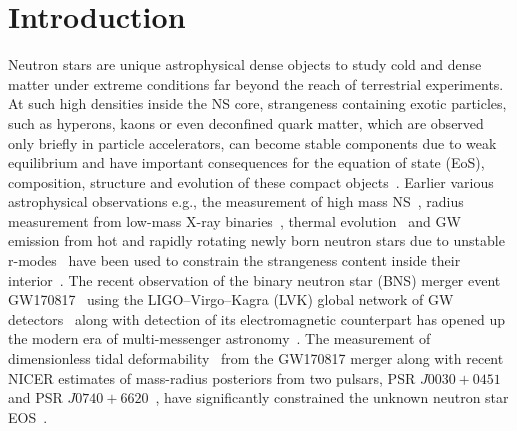 \documentclass[%
 reprint,
 amsmath,amssymb,
 aps,
]{revtex4-2}
\begin{document}
\maketitle


\section{\label{sec:intro} Introduction}
Neutron stars are unique astrophysical dense objects to study  cold  and  dense  matter  under  extreme  conditions far beyond the reach of terrestrial experiments. At such high densities inside the NS core, strangeness containing exotic  particles, such  as hyperons, kaons or even deconfined quark matter, which  are  observed  only  briefly  in  particle  accelerators, can become stable components  due to weak equilibrium and have important consequences for the equation of state (EoS), composition, structure and evolution of these compact objects~\cite{GlendenningBook,Lattimer2004,Blaschke2018}. %
Earlier various astrophysical observations e.g., the measurement of high mass NS~\cite{Weissenborn2011,Weissenborn_2012}, radius measurement from low-mass X-ray binaries~\cite{Constanca2013,Fortin2015}, thermal evolution~\cite{Anzuini_2021} and GW emission from  hot and rapidly rotating newly born neutron stars due to unstable r-modes~\cite{Lindblom2002,Debi_2006,Jha2022} have been used to constrain the strangeness content inside their interior~\cite{Chatterjee_2016}. The recent observation of the binary neutron star (BNS) merger event GW170817~\cite{Abbott2017,Abbott2018,Abbott2019} using the LIGO–Virgo–Kagra (LVK) global network of GW detectors~\citep{AdvLIGO2015,Abbott2016,AdvVIRGO2014,Kagra} along with detection of its electromagnetic counterpart has opened up the modern era of multi-messenger astronomy~\citep{MultiGW170817}. The measurement of dimensionless tidal deformability~\cite{Hinderer} from the GW170817 merger along with recent NICER estimates of mass-radius posteriors from two pulsars, PSR $J0030+0451$~\cite{NICER0030_Miller,NICER0030_Riley} and PSR $J0740+6620$~\cite{NICER0740_Miller,NICER0740_Riley}, have significantly constrained the unknown neutron star EOS~\cite{Dietrich2020,Pang_2021,Issac2021,Ghosh2022}.  \\
\end{document}

